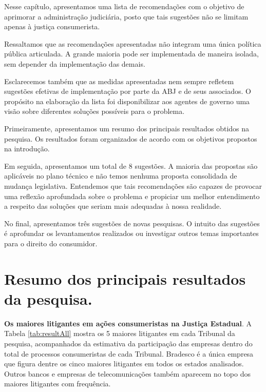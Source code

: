 \documentclass[]{report}
\begin{document}
Nesse capítulo, apresentamos uma lista de recomendações com o objetivo
de aprimorar a administração judiciária, posto que tais sugestões não se
limitam apenas à justiça consumerista.

Ressaltamos que as recomendações apresentadas não integram uma única
política pública articulada. A grande maioria pode ser implementada de
maneira isolada, sem depender da implementação das demais.

Esclarecemos também que as medidas apresentadas nem sempre refletem
sugestões efetivas de implementação por parte da ABJ e de seus
associados. O propósito na elaboração da lista foi disponibilizar aos
agentes de governo uma visão sobre diferentes soluções possíveis para o
problema.

Primeiramente, apresentamos um resumo dos principais resultados obtidos
na pesquisa. Os resultados foram organizados de acordo com os objetivos
propostos na introdução.

Em seguida, apresentamos um total de 8 sugestões. A maioria das
propostas são aplicáveis no plano técnico e não temos nenhuma proposta
consolidada de mudança legislativa. Entendemos que tais recomendações
são capazes de provocar uma reflexão aprofundada sobre o problema e
propiciar um melhor entendimento a respeito das soluções que seriam mais
adequadas à nossa realidade.

No final, apresentamos três sugestões de novas pesquisas. O intuito das
sugestões é aprofundar os levantamentos realizados ou investigar outros
temas importantes para o direito do consumidor.

\section{Resumo dos principais resultados da
pesquisa.}\label{resumo-dos-principais-resultados-da-pesquisa.}

\textbf{Os maiores litigantes em ações consumeristas na Justiça
Estadual}. A Tabela \ref{tab:resultAll} mostra os 5 maiores litigantes
em cada Tribunal da pesquisa, acompanhados da estimativa da participação
das empresas dentro do total de processos consumeristas de cada
Tribunal. Bradesco é a única empresa que figura dentre os cinco maiores
litigantes em todos os estados analisados. Outros bancos e empresas de
telecomunicações também aparecem no topo dos maiores litigantes com
frequência.
\end{document}
